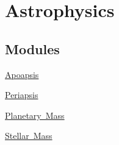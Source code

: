 \hypertarget{group___astrophysics}{}\section{Astrophysics}
\label{group___astrophysics}
\subsection*{Modules}
\begin{DoxyCompactItemize}
\item 
\mbox{\hyperlink{group___apoapsis}{Apoapsis}}
\item 
\mbox{\hyperlink{group___periapsis}{Periapsis}}
\item 
\mbox{\hyperlink{group___planetary_mass}{Planetary Mass}}
\item 
\mbox{\hyperlink{group___stellar_mass}{Stellar Mass}}
\end{DoxyCompactItemize}
